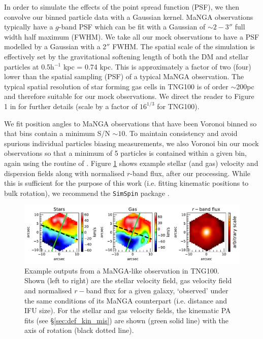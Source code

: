 In order to simulate the effects of the point spread function (PSF), we then convolve our binned particle data with a Gaussian kernel. MaNGA observations typically have a $g$-band PSF which can be fit with a Gaussian of $\sim 2-3''$ full width half maximum (FWHM). We take all our mock observations to have a PSF modelled by a Gaussian with a 2$''$ FWHM. The spatial scale of the simulation is effectively set by the gravitational softening length of both the DM and stellar particles at 0.5h$^{-1}$ kpc = 0.74 kpc. This is approximately a factor of two (four) lower than the spatial sampling (PSF) of a typical MaNGA observation. The typical spatial resolution of star forming gas cells in TNG100 is of order $\sim$200pc and therefore suitable for our mock observations. We direct the reader to Figure 1 in \citet{pillepich2019} for further details (scale by a factor of $16^{1/3}$ for TNG100). 

We fit position angles to MaNGA observations that have been Voronoi binned so that bins contain a minimum S/N $\sim 10$. To maintain consistency and avoid spurious individual particles biasing measurements, we also Voronoi bin our mock observations so that a minimum of 5 particles is contained within a given bin, again using the routine of \citet{cappellari2003}. Figure \ref{fig:example_obs} shows example stellar (and gas) velocity and dispersion fields along with normalised $r$-band flux, after our processing. While this is sufficient for the purpose of this work (i.e. fitting kinematic positions to bulk rotation), we recommend the \texttt{SimSpin} package \citep{harborne2019, harborne2020}.

\begin{figure}
	\includegraphics[width=\linewidth]{misalignment_TNG/example_kinematics.pdf}
    \caption{Example outputs from a MaNGA-like observation in TNG100. Shown (left to right) are the stellar velocity field, gas velocity field and normalised $r-$band flux for a given galaxy, `observed' under the same conditions of its MaNGA counterpart (i.e. distance and IFU size). For the stellar and gas velocity fields, the kinematic PA fits (see \S\ref{sec:def_kin_mis}) are shown (green solid line) with the axis of rotation (black dotted line).}
    \label{fig:example_obs}
\end{figure}

